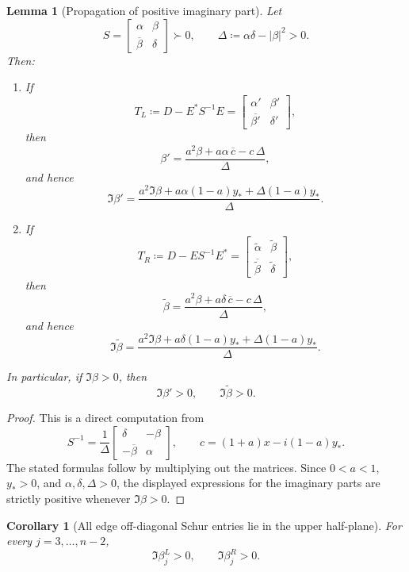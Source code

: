 \documentclass[11pt]{article}
\newtheorem{lemma}[theorem]{Lemma}
\newtheorem{corollary}[theorem]{Corollary}
\begin{document}
\begin{lemma}[Propagation of positive imaginary part]\label{lem:beta-propagation}
Let
\[
S=
\begin{bmatrix}
\alpha&\beta\\
\overline\beta&\delta
\end{bmatrix}\succ 0,
\qquad
\Delta\coloneqq \alpha\delta-|\beta|^2>0.
\]
Then:
\begin{enumerate}
\item If
\[
T_L\coloneqq D-E^*S^{-1}E
=
\begin{bmatrix}
\alpha'&\beta'\\
\overline{\beta'}&\delta'
\end{bmatrix},
\]
then
\[
\beta'
=
\frac{a^2\beta+a\alpha\,\overline c-c\,\Delta}{\Delta},
\]
and hence
\[
\Im \beta'
=
\frac{a^2\Im\beta + a\alpha(1-a)y_* + \Delta(1-a)y_*}{\Delta}.
\]

\item If
\[
T_R\coloneqq D-ES^{-1}E^*
=
\begin{bmatrix}
\widetilde\alpha&\widetilde\beta\\
\overline{\widetilde\beta}&\widetilde\delta
\end{bmatrix},
\]
then
\[
\widetilde\beta
=
\frac{a^2\beta+a\delta\,\overline c-c\,\Delta}{\Delta},
\]
and hence
\[
\Im \widetilde\beta
=
\frac{a^2\Im\beta + a\delta(1-a)y_* + \Delta(1-a)y_*}{\Delta}.
\]
\end{enumerate}
In particular, if \(\Im\beta>0\), then
\[
\Im\beta'>0,
\qquad
\Im\widetilde\beta>0.
\]
\end{lemma}

\begin{proof}
This is a direct computation from
\[
S^{-1}
=
\frac1\Delta
\begin{bmatrix}
\delta & -\beta\\
-\overline\beta & \alpha
\end{bmatrix},
\qquad
c=(1+a)x-i(1-a)y_*.
\]
The stated formulas follow by multiplying out the matrices. Since \(0<a<1\), \(y_*>0\), and
\(\alpha,\delta,\Delta>0\), the displayed expressions for the imaginary parts are strictly positive whenever
\(\Im\beta>0\).
\end{proof}

\begin{corollary}[All edge off-diagonal Schur entries lie in the upper half-plane]\label{cor:beta-upper-half-plane}
For every \(j=3,\dots,n-2\),
\[
\Im \beta_j^L>0,
\qquad
\Im \beta_j^R>0.
\]
\end{corollary}
\end{document}
